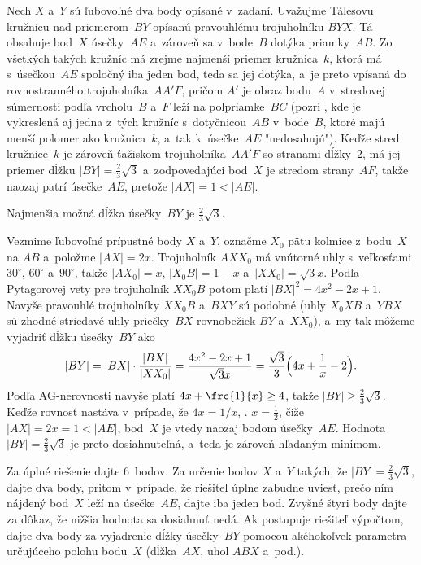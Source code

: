 {%
Nech $X$ a~$Y$ sú ľubovoľné dva body opísané v~zadaní. Uvažujme Tálesovu
kružnicu nad priemerom~$BY$ opísanú pravouhlému trojuholníku $BYX$.
Tá obsahuje bod~$X$ úsečky~$AE$ a~zároveň sa v~bode~$B$ dotýka priamky~$AB$.
Zo všetkých takých kružníc má zrejme najmenší priemer kružnica~$k$, ktorá má
s~úsečkou~$AE$ spoločný iba jeden bod, teda sa jej dotýka, a~je preto vpísaná do
rovnostranného trojuholníka~$AA'F$, pričom $A'$ je obraz bodu~$A$ v~stredovej
súmernosti podľa vrcholu~$B$ a~$F$ leží na polpriamke~$BC$ (pozri \obr, kde
je vykreslená aj jedna z~tých kružníc s~dotyčnicou~$AB$ v~bode~$B$, ktoré majú
menší polomer ako kružnica~$k$, a~tak k~úsečke~$AE$ "nedosahujú").
Keďže stred kružnice~$k$ je zároveň ťažiskom trojuholníka~$AA'F$
so stranami dĺžky~$2$, má jej priemer dĺžku $|BY| = \frac23 \sqrt{3}$
a~zodpovedajúci bod~$X$ je stredom strany~$AF$,
takže naozaj patrí úsečke~$AE$, pretože $|AX|=1<|AE|$.
%

\odpoved
Najmenšia možná dĺžka úsečky~$BY$ je $\frac23 \sqrt{3}$.


\ineriesenie
Vezmime ľubovoľné prípustné body $X$ a~$Y$, označme $X_0$ pätu
kolmice z~bodu~$X$ na $AB$ a~položme $|AX| = 2x$. Trojuholník
$AXX_0$ má vnútorné uhly s~veľkosťami $30^\circ$, $60^\circ$
a~$90^\circ$, takže $|AX_0| = x$, $|X_0B| =
1-x$ a~$|XX_0| = \sqrt{3} x$. Podľa Pytagorovej vety pre trojuholník
$XX_0B$ potom platí $|BX|^2 = 4x^2 -2x+1$.
Navyše pravouhlé trojuholníky $XX_0B$ a~$BXY$ sú podobné
(uhly $X_0XB$ a~$YBX$ sú zhodné striedavé uhly priečky~$BX$
rovnobežiek $BY$ a~$XX_0$), a~my
tak môžeme vyjadriť dĺžku úsečky~$BY$ ako
$$
|BY| = |BX|\cdot \frac{|BX|}{|XX_0|} = \frac{4x^2 -2x+1}{\sqrt{3}x} =
\frac{\sqrt{3}}{3} \Bigl( 4x + \frac{1}{x} - 2 \Bigr).
$$
Podľa AG-nerovnosti navyše platí $4x + \frc{1}{x} \ge 4$, takže
$|BY| \ge \frac23 \sqrt{3}$. Keďže rovnosť nastáva v~prípade, že $4x=1/x$, \tj. $x =\frac12$, čiže $|AX|=2x=1<|AE|$, bod~$X$ je
vtedy naozaj bodom úsečky~$AE$. Hodnota $|BY| = \frac{2}{3} \sqrt{3}$ je preto dosiahnuteľná, a~teda je
zároveň hľadaným minimom.


\nobreak\medskip\petit\noindent
Za úplné riešenie dajte 6~bodov.
Za určenie bodov $X$ a~$Y$ takých, že
$|BY| = \frac23 \sqrt{3}$, dajte dva body, pritom v~prípade, že
riešiteľ úplne zabudne uviesť, prečo ním nájdený bod~$X$ leží
na úsečke~$AE$, dajte iba jeden bod. Zvyšné štyri
body dajte za dôkaz, že nižšia hodnota sa dosiahnuť nedá.
Ak postupuje riešiteľ výpočtom, dajte dva body za vyjadrenie
dĺžky úsečky~$BY$ pomocou akéhokoľvek parametra určujúceho
polohu bodu~$X$ (dĺžka~$AX$, uhol $ABX$ a~pod.).
\endpetit
\bigbreak
}

